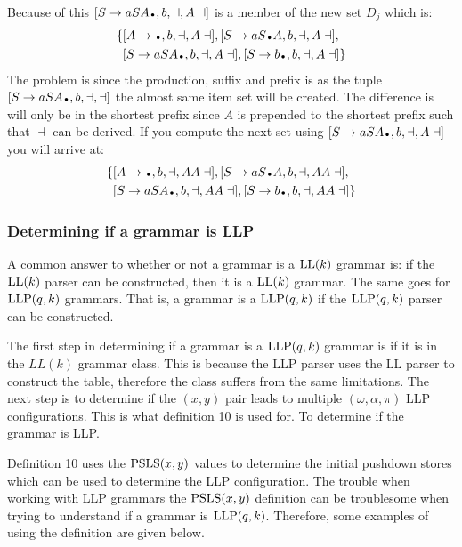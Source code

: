Because of this $[S \to a SA\bigdot, b, \dashv, A \dashv]$ is a member of the new set $D_j$ which is:
\begin{align*}
    \{ &[A \to \bigdot , b, \dashv, A \dashv],[S \to a S\bigdot A, b, \dashv, A \dashv], \\
    & [S \to a S A\bigdot , b, \dashv, A \dashv],[S \to b\bigdot , b, \dashv, A \dashv]\}
\end{align*}
The problem is since the production, suffix and prefix is as the tuple $[S \to a S A\bigdot , b, \dashv, \dashv]$ the almost same item set will be created. The difference is will only be in the shortest prefix since $A$ is prepended to the shortest prefix such that $\dashv$ can be derived. If you compute the next set using $[S \to a S A\bigdot , b, \dashv, A \dashv]$ you will arrive at:
\begin{align*}
    \{& [A \to \bigdot , b, \dashv, A A \dashv],[S \to a S\bigdot A, b, \dashv, A A \dashv], \\
    & [S \to a S A\bigdot , b, \dashv, A A \dashv],[S \to b\bigdot , b, \dashv, A A \dashv]\}
\end{align*}


\subsubsection{Determining if a grammar is LLP}
A common answer to whether or not a grammar is a $\text{LL}(k)$ grammar is: if the $\text{LL}(k)$ parser can be constructed, then it is a $\text{LL}(k)$ grammar. The same goes for $\text{LLP}(q,k)$ grammars. That is, a grammar is a $\text{LLP}(q,k)$ if the $\text{LLP}(q, k)$ parser can be constructed.

The first step in determining if a grammar is a $\text{LLP}(q,k)$ grammar is if it is in the $LL(k)$ grammar class. This is because the LLP parser uses the LL parser to construct the table, therefore the class suffers from the same limitations. The next step is to determine if the $(x, y)$ pair leads to multiple $(\omega, \alpha, \pi)$ LLP configurations. This is what definition 10 \cite[13]{Vagner2007} is used for. To determine if the grammar is LLP.

Definition 10 \cite[13]{Vagner2007} uses the $\text{PSLS}(x, y)$ \cite[12]{Vagner2007} values to determine the initial pushdown stores which can be used to determine the LLP configuration. The trouble when working with LLP grammars the $\text{PSLS}(x, y)$ definition can be troublesome when trying to understand if a grammar is $\text{LLP}(q, k)$. Therefore, some examples of using the definition are given below.


